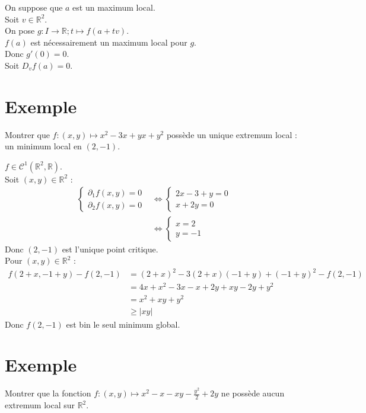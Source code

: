 \documentclass[../main.tex]{subfiles}
\begin{document}
\noindent On suppose que $a$ est un maximum local. \\
Soit $v\in \mathbb{R}^2$. \\
On pose $g:I\to \mathbb{R}; t\mapsto f(a + tv)$. \\
$f(a)$ est nécessairement un maximum local pour $g$. \\
Donc $g'(0) = 0$. \\
Soit $D_v f(a) = 0$. 

\section{Exemple}
\begin{tcolorbox}[title=Exemple 36.52, title filled=false, colframe=darkgreen, colback=darkgreen!10!white]
    Montrer que $f:(x, y) \mapsto x^2-3 x+y x+y^2$ possède un unique extremum local : un minimum local en $(2,-1)$.
\end{tcolorbox}

\noindent $f\in \mathcal{C}^1(\mathbb{R}^2, \mathbb{R})$. \\
Soit $(x, y)\in \mathbb{R}^2$ : 
\begin{align*}
    \begin{cases}
        \partial_1 f(x, y) = 0 \\
        \partial_2 f(x, y) = 0
    \end{cases} &\Leftrightarrow \begin{cases}
        2x - 3 + y = 0 \\
        x + 2y = 0
    \end{cases} \\
    &\Leftrightarrow \begin{cases}
        x = 2 \\
        y = -1
    \end{cases}
\end{align*}
Donc $(2, -1)$ est l'unique point critique. \\
Pour $(x, y)\in \mathbb{R}^2$ : 
\begin{align*}
    f(2 + x, -1 + y) - f(2, -1) &= (2 + x)^2 - 3(2 + x)(-1 + y) + (-1 + y)^2 - f(2, -1) \\
    &= 4x + x^2 - 3x - x + 2y + xy - 2y + y^2 \\
    &= x^2 + xy + y^2 \\
    &\geq |xy|
\end{align*}
Donc $f(2, -1)$ est bin le seul minimum global. 

\section{Exemple}
\begin{tcolorbox}[title=Exemple 36.53, title filled=false, colframe=darkgreen, colback=darkgreen!10!white]
    Montrer que la fonction $f:(x, y) \mapsto x^2-x-x y-\frac{y^2}{2}+2 y$ ne possède aucun extremum local sur $\mathbb{R}^2$.
\end{tcolorbox}
\end{document}
